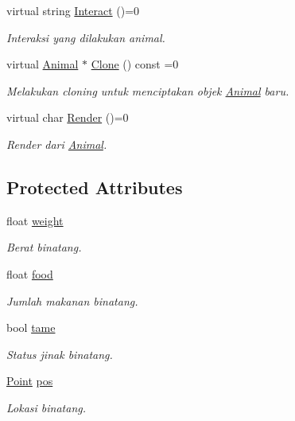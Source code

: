 \begin{DoxyCompactItemize}
virtual string \hyperlink{classAnimal_ad5a55fb0355a9425fee6611003d9892c}{Interact} ()=0
\begin{DoxyCompactList}\small\item\em Interaksi yang dilakukan animal. \end{DoxyCompactList}\item 
virtual \hyperlink{classAnimal}{Animal} $\ast$ \hyperlink{classAnimal_a3fc95e2a588b653b9b315e6c7a29c89f}{Clone} () const =0
\begin{DoxyCompactList}\small\item\em Melakukan cloning untuk menciptakan objek \hyperlink{classAnimal}{Animal} baru. \end{DoxyCompactList}\item 
virtual char \hyperlink{classAnimal_a43a47c0f41d211128e04abc6add53def}{Render} ()=0
\begin{DoxyCompactList}\small\item\em Render dari \hyperlink{classAnimal}{Animal}. \end{DoxyCompactList}\end{DoxyCompactItemize}
\subsection*{Protected Attributes}
\begin{DoxyCompactItemize}
\item 
float \hyperlink{classAnimal_a055c4df7dacb89eb4c2ca9bbee11ff24}{weight}
\begin{DoxyCompactList}\small\item\em Berat binatang. \end{DoxyCompactList}\item 
float \hyperlink{classAnimal_adb6cda9dddcd113576b887f01d648711}{food}
\begin{DoxyCompactList}\small\item\em Jumlah makanan binatang. \end{DoxyCompactList}\item 
bool \hyperlink{classAnimal_a2f41d5123d973bd889ff9ee9d7ac6fd1}{tame}
\begin{DoxyCompactList}\small\item\em Status jinak binatang. \end{DoxyCompactList}\item 
\hyperlink{classPoint}{Point} \hyperlink{classAnimal_ae4e9a6fe53c7ebfbb00536f0e38de5c8}{pos}
\begin{DoxyCompactList}\small\item\em Lokasi binatang. \end{DoxyCompactList}\end{DoxyCompactItemize}



